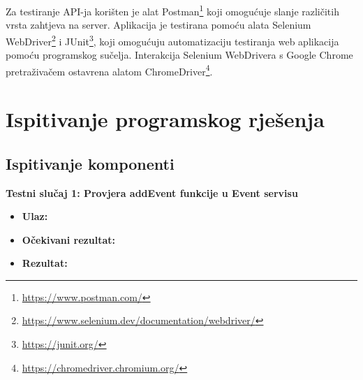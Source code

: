 Za testiranje API-ja korišten je alat Postman\footnote{\url{https://www.postman.com/}} koji omogućuje slanje različitih vrsta zahtjeva na server. Aplikacija je testirana pomoću alata Selenium WebDriver\footnote{\url{https://www.selenium.dev/documentation/webdriver/}} i JUnit\footnote{\url{https://junit.org/}}, koji omogućuju automatizaciju testiranja web aplikacija pomoću programskog sučelja. Interakcija Selenium WebDrivera s Google Chrome pretraživačem ostavrena alatom ChromeDriver\footnote{\url{https://chromedriver.chromium.org/}}.
			\eject 
		
	
		\section{Ispitivanje programskog rješenja}
			
			\subsection{Ispitivanje komponenti}
			\noindent \textbf{Testni slučaj 1: Provjera addEvent funkcije u Event servisu}
						\begin{itemize}
	
						\item[] \textbf{Ulaz: }
						\item[] \textbf{Očekivani rezultat: }
						\item[] \textbf{Rezultat: }
						\end{itemize}
						
